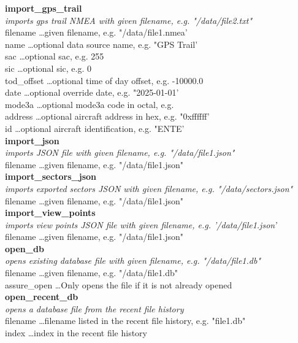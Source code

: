 \textbf{import\_gps\_trail} \\
\textit{imports gps trail NMEA with given filename, e.g. "/data/file2.txt"} \\
filename \dots given filename, e.g. "/data/file1.nmea' \\
name \dots optional data source name, e.g. "GPS Trail' \\
sac \dots optional sac, e.g. 255 \\
sic \dots optional sic, e.g. 0 \\
tod\_offset \dots optional time of day offset, e.g. -10000.0 \\
date \dots optional override date, e.g. "2025-01-01' \\
mode3a \dots optional mode3a code in octal, e.g.  \\
address \dots optional aircraft address in hex, e.g. "0xffffff' \\
id \dots optional aircraft identification, e.g. "ENTE' \\

\textbf{import\_json} \\
\textit{imports JSON file with given filename, e.g. "/data/file1.json"} \\
filename \dots given filename, e.g. "/data/file1.json" \\

\textbf{import\_sectors\_json} \\
\textit{imports exported sectors JSON with given filename, e.g. "/data/sectors.json"} \\ 
filename \dots given filename, e.g. "/data/file1.json" \\

\textbf{import\_view\_points} \\
\textit{imports view points JSON file with given filename, e.g. '/data/file1.json'} \\
filename \dots given filename, e.g. "/data/file1.json" \\

\textbf{open\_db} \\
\textit{opens existing database file with given filename, e.g. "/data/file1.db"} \\
filename \dots given filename, e.g. "/data/file1.db" \\
assure\_open \dots Only opens the file if it is not already opened \\

\textbf{open\_recent\_db} \\
\textit{opens a database file from the recent file history} \\
filename \dots filename listed in the recent file history, e.g. "file1.db" \\
index \dots index in the recent file history \\

